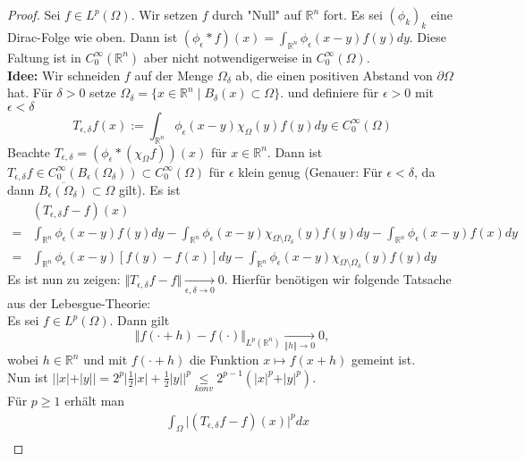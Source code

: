 \documentclass[12pt,titlepage]{article}
\numberwithin{equation}{section}
\begin{document}
\begin{proof}
Sei $f \in L^p(\Omega)$. Wir setzen $f$ durch "Null" auf $\mathbb{R}^n$ fort. Es sei $(\phi_k)_k$ eine Dirac-Folge wie oben. Dann ist $( \phi_{\epsilon} \ast f)(x)=\int_{\mathbb{R}^n}\phi_{\epsilon} (x-y)f(y)dy$. Diese Faltung ist in $C_0^{\infty}(\mathbb{R}^n)$ aber nicht notwendigerweise in $C^{\infty}_0(\Omega).$\\
\textbf{Idee:} Wir schneiden $f$ auf der Menge $\Omega_{\delta}$ ab, die einen positiven Abstand von $\partial \Omega$ hat. Für $\delta >0$ setze $\Omega_{\delta}=\{ x \in \mathbb{R}^n\mid B_{\delta}(x)\subset \Omega\}.$ und definiere für $\epsilon>0$ mit $\epsilon <\delta$
\[
T_{\epsilon,\delta}f(x):=\int_{\mathbb{R}^n}\phi_{\epsilon}(x-y)\chi_{\Omega}(y)f(y)dy \in C_0^{\infty}(\Omega)
\]
Beachte $T_{\epsilon,\delta}=(\phi_{\epsilon}\ast (\chi_{\Omega} f))(x)$ für $x \in \mathbb{R}^n.$ Dann ist $T_{\epsilon,\delta}f\in C_0^{\infty}(B_{\epsilon}(\Omega_{\delta}))\subset C_0^{\infty}(\Omega)$ für $\epsilon$ klein genug (Genauer: Für $\epsilon <\delta$, da dann $\overline{B_{\epsilon}(\Omega_{\delta})} \subset \Omega$ gilt). Es ist 
\begin{align*}
&(T_{\epsilon,\delta}f-f)(x)\\
=&\int_{\mathbb{R}^n}\phi_{\epsilon}(x-y)f(y)dy-\int_{\mathbb{R}^n}\phi_{\epsilon}(x-y)\chi_{\Omega\setminus \Omega_{\delta}}(y)f(y)dy-\int_{\mathbb{R}^n}\phi_{\epsilon}(x-y)f(x)dy\\
=&\int_{\mathbb{R}^n}\phi_{\epsilon}(x-y)[f(y)-f(x)]dy-\int_{\mathbb{R}^n}\phi_{\epsilon}(x-y)\chi_{\Omega\setminus \Omega_{\delta}}(y)f(y)dy
\end{align*}
Es ist nun zu zeigen: $\Vert T_{\epsilon,\delta}f-f\Vert \underset{\epsilon,\delta \rightarrow 0}{\rightarrow}0$. Hierfür benötigen wir folgende Tatsache aus der Lebesgue-Theorie:\\
Es sei $f\in L^p(\Omega).$ Dann gilt 
\[
\Vert f(\cdot + h)-f(\cdot)\Vert_{L^p(\mathbb{R}^n)}\underset{\Vert h \Vert \rightarrow 0}{\rightarrow}0,
\]wobei $h\in \mathbb{R}^n$ und mit $f(\cdot +h)$ die Funktion $x \mapsto f(x+h)$ gemeint ist. \\
Nun ist $\vert \vert x \vert + \vert y\vert \vert=2^p\vert \frac{1}{2}\vert x \vert + \frac{1}{2}\vert y\vert \vert^p\underset{konv}{\leq}2^{p-1}(\vert x\vert^p+ \vert y\vert ^p)$.\\
Für $p \geq 1$ erhält man
\begin{align*}
&\int_{\Omega} \vert(T_{\epsilon,\delta}f-f)(x) \vert^p dx\\

\end{align*}
\end{proof}
\end{document}
